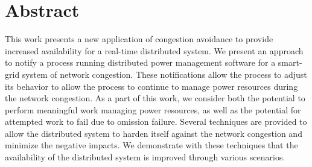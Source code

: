 \section{Abstract}

This work presents a new application of congestion avoidance to provide increased availability for a real-time distributed system.
We present an approach to notify a process running distributed power management software for a smart-grid system of network congestion.
These notifications allow the process to adjust its behavior to allow the process to continue to manage power resources during the network congestion.
As a part of this work, we consider both the potential to perform meaningful work managing power resources, as well as the potential for attempted work to fail due to omission failure.
Several techniques are provided to allow the distributed system to harden itself against the network congestion and minimize the negative impacts.
We demonstrate with these techniques that the availability of the distributed system is improved through various scenarios.
